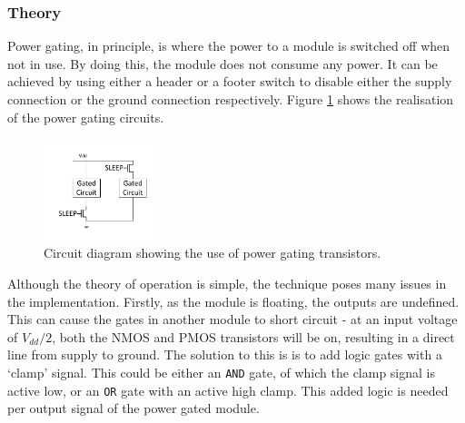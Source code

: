 \subsubsection{Theory}

Power gating, in principle, is where the power to a module is switched off when not in use. 
By doing this, the module does not consume any power. 
It can be achieved by using either a header or a footer switch to disable either the supply connection or the ground connection respectively. 
Figure \ref{fig:powerswitches} shows the realisation of the power gating circuits.

\begin{figure}[h]
\centering
\includegraphics[width=0.3\textwidth]{Figures/powergating_switches.pdf}
\caption{Circuit diagram showing the use of power gating transistors.}%
\label{fig:powerswitches}
\end{figure}



Although the theory of operation is simple, the technique poses many issues in the implementation.
Firstly, as the module is floating, the outputs are undefined.
This can cause the gates in another module to short circuit - at an input voltage of $ V_{dd} / 2 $, both the NMOS and PMOS transistors will be on, resulting in a direct line from supply to ground. 
The solution to this is is to add logic gates with a `clamp' signal. 
This could be either an \texttt{AND} gate, of which the clamp signal is active low, or an \texttt{OR} gate with an active high clamp. 
This added logic is needed per output signal of the power gated module.


